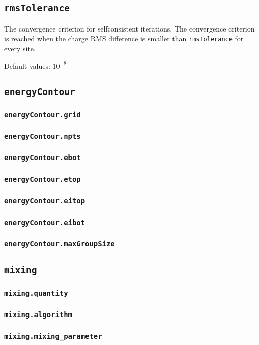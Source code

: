 \subsection{\texttt{rmsTolerance}}
The convergence criterion for selfconsistent iterations. The convergence criterion is reached when
the charge RMS difference is smaller than \texttt{rmsTolerance} for every site.

Default values: $10^{-8}$

\subsection{\texttt{energyContour}}

\subsubsection{\texttt{energyContour.grid}}

\subsubsection{\texttt{energyContour.npts}}

\subsubsection{\texttt{energyContour.ebot}}

\subsubsection{\texttt{energyContour.etop}}

\subsubsection{\texttt{energyContour.eitop}}

\subsubsection{\texttt{energyContour.eibot}}

\subsubsection{\texttt{energyContour.maxGroupSize}}

\subsection{\texttt{mixing}}

\subsubsection{\texttt{mixing.quantity}}

\subsubsection{\texttt{mixing.algorithm}}

\subsubsection{\texttt{mixing.mixing\_parameter}}
